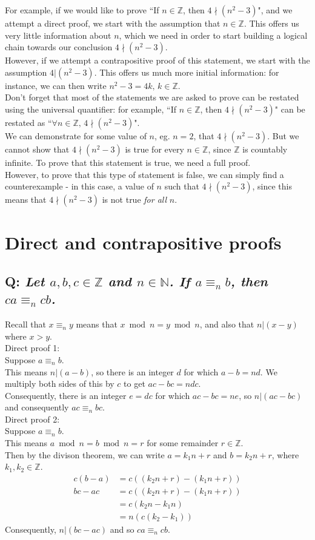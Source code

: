 \documentclass{article}
\begin{document}
For example, if we would like to prove ``If $n\in\mathbb{Z}$, then $4\nmid(n^2-3)$", and we attempt a direct proof, we start with the assumption that $n\in\mathbb{Z}$. This offers us very little information about $n$, which we need in order to start building a logical chain towards our conclusion $4\nmid(n^2-3)$.\\
However, if we attempt a contrapositive proof of this statement, we start with the assumption $4|(n^2-3)$. This offers us much more initial information: for instance, we can then write $n^2-3=4k,\,k\in\mathbb{Z}$.\\[1em]
Don't forget that most of the statements we are asked to prove can be restated using the universal quantifier: for example, ``If $n\in\mathbb{Z}$, then $4\nmid(n^2-3)$" can be restated as ``$\forall n\in\mathbb{Z},\,4\nmid(n^2-3)$".\\
We can demonstrate for some value of $n$, eg. $n=2$, that $4\nmid(n^2-3)$. But we cannot show that $4\nmid(n^2-3)$ is true for every $n\in\mathbb{Z}$, since $\mathbb{Z}$ is countably infinite. To prove that this statement is true, we need a full proof.\\[1ex]
However, to prove that this type of statement is false, we can simply find a counterexample - in this case, a value of $n$ such that $4\nmid(n^2-3)$, since this means that $4\nmid(n^2-3)$ is not true \textit{for all} $n$.

\section{\sc Direct and contrapositive proofs}

\subsection*{Q: {\em Let $a,b,c\in\mathbb{Z}$ and $n\in\mathbb{N}$. If $a\equiv_nb$, then $ca\equiv_ncb$.}}

Recall that $x\equiv_ny$ means that $x\bmod n= y\bmod n$, and also that $n|(x-y)$ where $x>y$.\\[1em]
Direct proof 1:\\[1ex]
Suppose $a \equiv_n b$.\\
This means $n | ( a -b )$, so there is an integer $d$ for which $a - b = nd$. We multiply both sides of this by $c$ to get $ac - bc = ndc$.\\
Consequently, there is an integer $e = dc$ for which $ac - bc = ne$, so $n | ( ac - bc )$
and consequently $ac \equiv_n bc$.\\[1em]
Direct proof 2:\\[1ex]
Suppose $a \equiv_n b$.\\
This means $a\bmod n=b\bmod n=r$ for some remainder $r\in\mathbb{Z}$.\\
Then by the divison theorem, we can write $a=k_1n+r$ and $b=k_2n+r$, where $k_1,k_2\in\mathbb{Z}$.
\begin{align*}
c(b-a)&=c((k_2n+r)-(k_1n+r))\\
bc-ac&=c((k_2n+r)-(k_1n+r))\\
&=c(k_2n-k_1n)\\
&=n(c(k_2-k_1))
\end{align*}
Consequently, $n|(bc-ac)$ and so $ca\equiv_ncb$.
\end{document}
